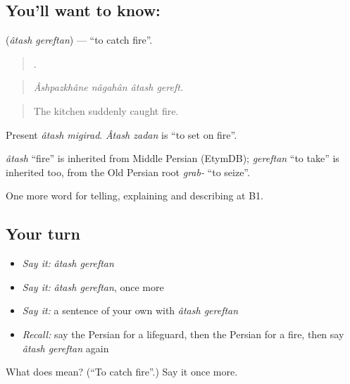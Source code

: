 \subsection*{You'll want to know:  }
\textbf{ } (\emph{âtash gereftan}) — \textquotedblleft{}to catch fire\textquotedblright{}.

\begin{quote}
   .
\end{quote}

\begin{quote}
\emph{Âshpazkhâne nâgahân âtash gereft.}
\end{quote}

\begin{quote}
The kitchen suddenly caught fire.
\end{quote}

Present \emph{âtash migirad}. \emph{Âtash zadan} is \textquotedblleft{}to set on fire\textquotedblright{}.

\begin{cousinweb}
\emph{âtash} \textquotedblleft{}fire\textquotedblright{} is inherited from Middle Persian (EtymDB); \emph{gereftan} \textquotedblleft{}to take\textquotedblright{} is inherited too, from the Old Persian root \emph{grab-} \textquotedblleft{}to seize\textquotedblright{}.
\end{cousinweb}

\begin{grammarlens}[title={What you've built}]
One more word for telling, explaining and describing at B1.
\end{grammarlens}

\subsection*{Your turn}
\begin{itemize}
\raggedright
  \item \emph{Say it:} \emph{âtash gereftan}
  \item \emph{Say it:} \emph{âtash gereftan}, once more
  \item \emph{Say it:} a sentence of your own with \emph{âtash gereftan}
  \item \emph{Recall:} say the Persian for a lifeguard, then the Persian for a fire, then say \emph{âtash gereftan} again
\end{itemize}

\begin{tcolorbox}[breakable,colback=teal!4,colframe=teal!35!black,title={Before you move on}]
What does   mean? (\textquotedblleft{}To catch fire\textquotedblright{}.) Say it once more.
\end{tcolorbox}
